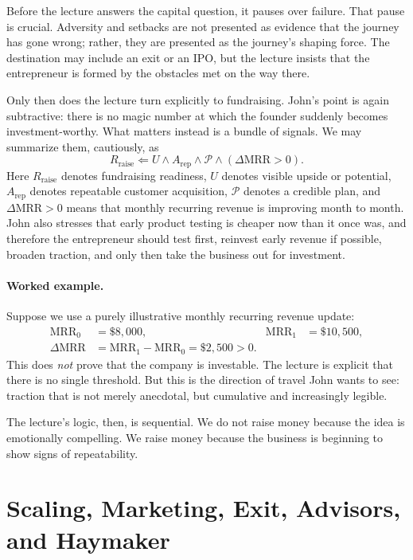 Before the lecture answers the capital question, it pauses over failure. That pause is crucial. Adversity and setbacks are not presented as evidence that the journey has gone wrong; rather, they are presented as the journey's shaping force. The destination may include an exit or an IPO, but the lecture insists that the entrepreneur is formed by the obstacles met on the way there.

Only then does the lecture turn explicitly to fundraising. John's point is again subtractive: there is no magic number at which the founder suddenly becomes investment-worthy. What matters instead is a bundle of signals. We may summarize them, cautiously, as
\begin{equation}
R_{\mathrm{raise}} \Leftarrow U \land A_{\mathrm{rep}} \land \mathcal{P} \land (\Delta \mathrm{MRR} > 0).
\end{equation}
Here \(R_{\mathrm{raise}}\) denotes fundraising readiness, \(U\) denotes visible upside or potential, \(A_{\mathrm{rep}}\) denotes repeatable customer acquisition, \(\mathcal{P}\) denotes a credible plan, and \(\Delta \mathrm{MRR} > 0\) means that monthly recurring revenue is improving month to month. John also stresses that early product testing is cheaper now than it once was, and therefore the entrepreneur should test first, reinvest early revenue if possible, broaden traction, and only then take the business out for investment.

\paragraph{Worked example.}
Suppose we use a purely illustrative monthly recurring revenue update:
\begin{align}
\mathrm{MRR}_0 &= \$8{,}000, &
\mathrm{MRR}_1 &= \$10{,}500, \\
\Delta \mathrm{MRR} &= \mathrm{MRR}_1 - \mathrm{MRR}_0 = \$2{,}500 > 0.
\end{align}
This does \emph{not} prove that the company is investable. The lecture is explicit that there is no single threshold. But this is the direction of travel John wants to see: traction that is not merely anecdotal, but cumulative and increasingly legible.

The lecture's logic, then, is sequential. We do not raise money because the idea is emotionally compelling. We raise money because the business is beginning to show signs of repeatability.

\section{Scaling, Marketing, Exit, Advisors, and Haymaker}


